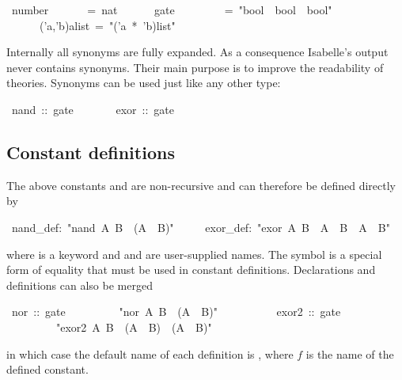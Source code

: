 \begin{isabelle}%
\ number\ \ \ \ \ \ \ =\ nat\isanewline
\ \ \ \ \ \ gate\ \ \ \ \ \ \ \ \ =\ {"}bool\ {\isasymRightarrow}\ bool\ {\isasymRightarrow}\ bool{"}\isanewline
\ \ \ \ \ \ ('a,'b)alist\ =\ {"}('a\ *\ 'b)list{"}%
\begin{isamarkuptext}%
\noindent{}%
Internally all synonyms are fully expanded.  As a consequence Isabelle's
output never contains synonyms.  Their main purpose is to improve the
readability of theories.  Synonyms can be used just like any other
type:%
\end{isamarkuptext}%
\ nand\ ::\ gate\isanewline
\ \ \ \ \ \ \ exor\ ::\ gate%
\begin{isamarkuptext}%
\subsection{Constant definitions}
\label{sec:ConstDefinitions}

The above constants  and  are non-recursive and can
therefore be defined directly by%
\end{isamarkuptext}%
\ nand\_def:\ {"}nand\ A\ B\ {\isasymequiv}\ {\isasymnot}(A\ {\isasymand}\ B){"}\isanewline
\ \ \ \ \ exor\_def:\ {"}exor\ A\ B\ {\isasymequiv}\ A\ {\isasymand}\ {\isasymnot}B\ {\isasymor}\ {\isasymnot}A\ {\isasymand}\ B{"}%
\begin{isamarkuptext}%
\noindent%
where  is a keyword and  and
 are user-supplied names.
The symbol  is a special form of equality
that must be used in constant definitions.
Declarations and definitions can also be merged%
\end{isamarkuptext}%
\ nor\ ::\ gate\isanewline
\ \ \ \ \ \ \ \ \ {"}nor\ A\ B\ {\isasymequiv}\ {\isasymnot}(A\ {\isasymor}\ B){"}\isanewline
\ \ \ \ \ \ \ \ \ \ exor2\ ::\ gate\isanewline
\ \ \ \ \ \ \ \ \ {"}exor2\ A\ B\ {\isasymequiv}\ (A\ {\isasymor}\ B)\ {\isasymand}\ ({\isasymnot}A\ {\isasymor}\ {\isasymnot}B){"}%
\begin{isamarkuptext}%
\noindent{}%
in which case the default name of each definition is , where
$f$ is the name of the defined constant.%
\end{isamarkuptext}%
\end{isabelle}%
